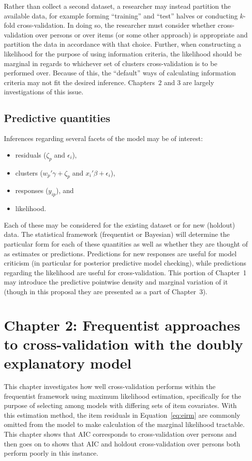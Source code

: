 \documentclass[letterpaper]{article}
\begin{document}
Rather than collect a second dataset, a researcher may instead partition the available data, for example forming ``training'' and ``test'' halves or conducting $k$-fold cross-validation. In doing so, the researcher must consider whether cross-validation over persons or over items (or some other approach) is appropriate and partition the data in accordance with that choice.
Further, when constructing a likelihood for the purpose of using information criteria, the likelihood should be marginal in regards to whichever set of clusters cross-validation is to be performed over. Because of this, the ``default'' ways of calculating information criteria may not fit the desired inference. Chapters~2 and 3 are largely investigations of this issue.

\subsection{Predictive quantities}

Inferences regarding several facets of the model may be of interest:
\begin{itemize}
	\item residuals ($\zeta_p$ and $\epsilon_i$),
	\item clusters ($w_p'\gamma + \zeta_p$ and $x_i'\beta + \epsilon_i$),
	\item responses ($y_{ip}$), and
	\item likelihood.
\end{itemize}
Each of these may be considered for the existing dataset or for new (holdout) data. The statistical framework (frequentist or Bayesian) will determine the particular form for each of these quantities as well as whether they are thought of as estimates or predictions. Predictions for new responses are useful for model criticism (in particular for posterior predictive model checking), while predictions regarding the likelihood are useful for cross-validation. This portion of Chapter~1 may introduce the predictive pointwise density and marginal variation of it (though in this proposal they are presented as a part of Chapter~3).


\section{Chapter 2: Frequentist approaches to cross-validation with the doubly explanatory model}

This chapter investigates how well cross-validation performs within the frequentist framework using maximum likelihood estimation, specifically for the purpose of selecting among models with differing sets of item covariates. With this estimation method, the item residuals in Equation~\ref{eq:eirm} are commonly omitted from the model to make calculation of the marginal likelihood tractable. This chapter shows that AIC \cite{akaike1974new} corresponds to cross-validation over persons and then goes on to shows that AIC and holdout cross-validation over persons both perform poorly in this instance.
\end{document}
